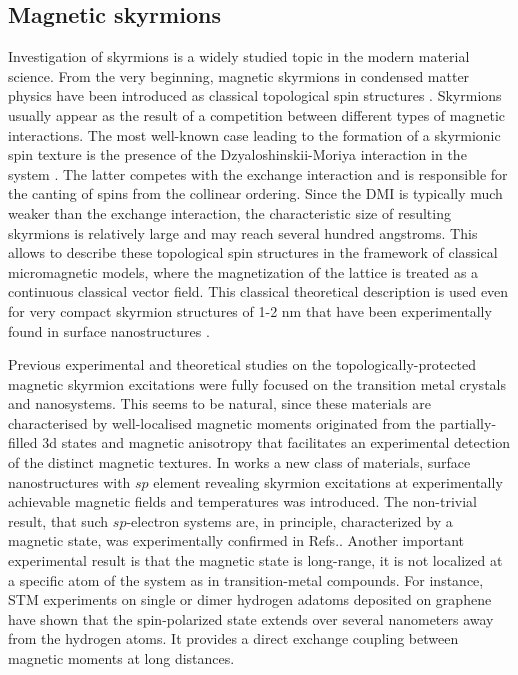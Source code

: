 \documentclass[aps,prl,twocolumn,showpacs,amsmath,amssymb]{revtex4-1}
\begin{document}
\subsection{Magnetic skyrmions}
Investigation of skyrmions is a widely studied topic in the modern material science. 
From the very beginning, magnetic skyrmions in condensed matter physics have been introduced as classical topological spin structures \cite{Bogdanov}. Skyrmions usually appear as the result of a competition between different types of magnetic interactions. The most well-known case leading to the formation of a skyrmionic spin texture is the presence of the Dzyaloshinskii-Moriya interaction in the system \cite{Muhlbauer, Neubauer, Munzer, Yu, Nagaosa, Janson}. The latter competes with the exchange interaction and is responsible for the canting of spins from the collinear ordering. Since the DMI is typically much weaker than the exchange interaction, the characteristic size of resulting skyrmions is relatively large and may reach several hundred angstroms. This allows to describe these topological spin structures in the framework of classical micromagnetic models, where the magnetization of the lattice is treated as a continuous classical vector field. This classical theoretical description is used even for very compact skyrmion structures of 1-2 nm that have been experimentally found in surface nanostructures \cite{Blugel_skyrm, Wiesendanger}.

Previous experimental and theoretical studies on the topologically-protected magnetic skyrmion excitations were fully focused on the transition metal crystals  and nanosystems. This seems to be natural, since these materials are characterised by well-localised magnetic moments originated from the partially-filled 3d states and magnetic anisotropy that facilitates an experimental detection of the distinct magnetic textures. In works \cite{C2F, Si,SiC} a new class of materials, surface nanostructures with $sp$ element revealing skyrmion excitations at experimentally achievable magnetic fields and temperatures was introduced. The non-trivial result, that such $sp$-electron systems are, in principle, characterized by a magnetic state,  was experimentally confirmed in Refs.\cite{Glass,Li}.  Another important experimental result is that  the magnetic state is long-range, it is not localized at a specific atom of the system as in transition-metal compounds. For instance, STM experiments \cite{Hgraphene} on single or dimer hydrogen adatoms deposited on graphene have shown that the spin-polarized state extends over several nanometers away from the hydrogen atoms. It provides a direct exchange coupling between magnetic moments at long distances.
\end{document}
